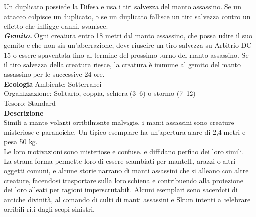 \begin{multicols}{2}
Un duplicato possiede la Difesa e usa i tiri salvezza del manto assassino. Se un attacco colpisce un duplicato, o se un duplicato fallisce un tiro salvezza contro un effetto che infligge danni, svanisce.\\
\emph{\textbf{Gemito.}} Ogni creatura entro 18 metri dal manto assassino, che possa udire il suo gemito e che non sia un'aberrazione, deve riuscire un tiro salvezza su Arbitrio DC  15 o essere spaventata fino al termine del prossimo turno del manto assassino. Se il tiro salvezza della creatura riesce, la creatura è immune al gemito del manto assassino per le successive 24 ore.\\
\textbf{Ecologia}
Ambiente: Sotterranei\\
Organizzazione: Solitario, coppia, schiera (3–6) o stormo (7–12)\\
Tesoro: Standard\\
\textbf{Descrizione}\\
Simili a mante volanti orribilmente malvagie, i manti assassini sono creature misteriose e paranoiche. Un tipico esemplare ha un’apertura alare di 2,4 metri e pesa 50 kg.\\

Le loro motivazioni sono misteriose e confuse, e diffidano perfino dei loro simili. La strana forma permette loro di essere scambiati per mantelli, arazzi o altri oggetti comuni, e alcune storie narrano di manti assassini che si alleano con altre creature, facendosi trasportare sulla loro schiena e contribuendo alla protezione dei loro alleati per ragioni imperscrutabili. Alcuni esemplari sono sacerdoti di antiche divinità, al comando di culti di manti assassini e Skum intenti a celebrare orribili riti dagli scopi sinistri.\\



\end{multicols}

